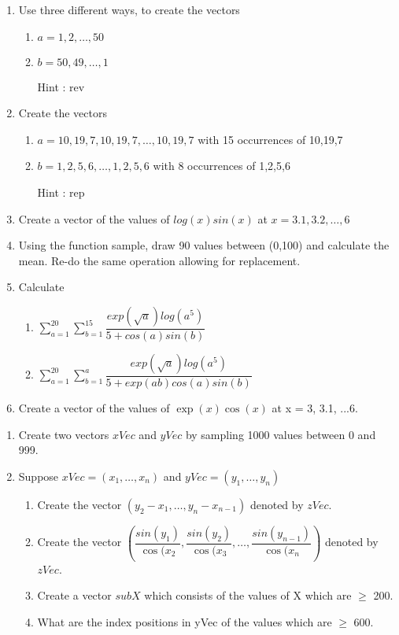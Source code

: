 \documentclass[11pt,a4paper]{article}
\newcommand{\1}{\mathbb{1}}
\begin{document}
\begin{Exercise}[title=Vectors - Introduction]
\begin{enumerate}
\item Use three different ways, to create the vectors 
\begin{enumerate}
\item $a=1,2,\ldots,50$
\item $b=50,49,\ldots,1$
\item[Hint]: rev
\end{enumerate} 
\item Create the vectors 
\begin{enumerate}
\item $a=10,19,7,10,19,7,\ldots,10,19,7$ with 15 occurrences of 10,19,7
\item $b=1,2,5,6,\ldots,1,2,5,6$ with 8 occurrences of 1,2,5,6
\item[Hint]: rep
\end{enumerate} 
\item Create a vector of the values of $log(x)sin(x)$ at $x=3.1,3.2,\ldots,6$
\item Using the function sample, draw 90 values between (0,100) and calculate the mean. Re-do the same operation allowing for replacement. 
\item Calculate 
\begin{enumerate}
\item $\sum_{a=1}^{20}\sum_{b=1}^{15}\dfrac{exp(\sqrt{a})log(a^5)}{5+cos(a)sin(b)}$
\item $\sum_{a=1}^{20}\sum_{b=1}^{a} \dfrac{exp(\sqrt{a})log(a^5)}{5+exp(ab)cos(a)sin(b)}$
\end{enumerate}
\item Create a vector of the values of $\exp(x) \cos(x)$ at x = 3, 3.1, ...6.
\end{enumerate}
\end{Exercise}

\begin{Exercise}[title=Vectors - Advanced]
\begin{enumerate}
\item Create two vectors $xVec$ and $yVec$ by sampling 1000 values between 0 and 999.
\item Suppose $xVec = (x_1, \ldots, x_n)$ and $yVec = (y_1, \ldots, y_n)$
\begin{enumerate}
\item Create the vector $(y_2-x_1,\ldots, y_n -x_{n-1})$ denoted by $zVec$.
\item Create the vector $(\dfrac{sin(y_1)}{\cos(x_2},\dfrac{sin(y_2)}{\cos(x_3}, \ldots, \dfrac{sin(y_{n-1})}{\cos(x_n})$ denoted by $zVec$.
\item Create a vector $subX$ which consists of the values of X which are $\geq$ 200.
\item What are the index positions in yVec of the values which are $\geq$ 600.
\end{enumerate}
\end{enumerate}
\end{Exercise}
\end{document}
